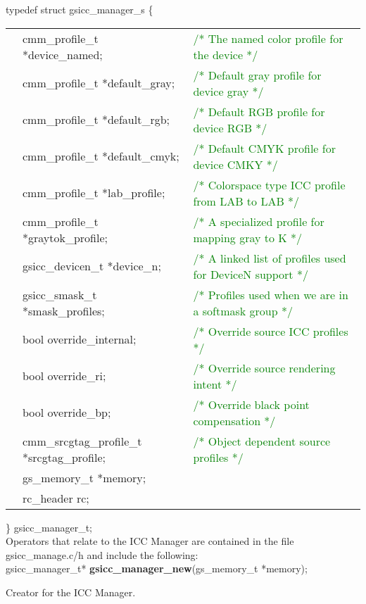\documentclass[12pt,notitlepage]{article}
\begin{document}
\noindent typedef struct gsicc\_manager\_s \{

\begin{tabular}{lll}
  & cmm\_profile\_t *device\_named;   & 	\textcolor{green}{/* The named color profile for the device */}  \\
  & cmm\_profile\_t *default\_gray;   & 	\textcolor{green}{/* Default gray profile for device gray */}   \\
  & cmm\_profile\_t *default\_rgb;    &	 \textcolor{green}{/* Default RGB profile for device RGB */}    \\
  & cmm\_profile\_t *default\_cmyk;   & 	\textcolor{green}{/* Default CMYK profile for device CMKY */} \\
  & cmm\_profile\_t *lab\_profile;    &  \textcolor{green}{/* Colorspace type ICC profile from LAB to LAB */}   \\
  & cmm\_profile\_t *graytok\_profile;&  \textcolor{green}{/* A specialized profile for mapping gray to K */}   \\
  & gsicc\_devicen\_t *device\_n;     &  \textcolor{green}{/* A linked list of profiles used for DeviceN support */} \\
  & gsicc\_smask\_t *smask\_profiles; &  \textcolor{green}{/* Profiles used when we are in a softmask group */ } \\
  & bool override\_internal; &  \textcolor{green}{/* Override source ICC profiles */ } \\
  & bool override\_ri;  &  \textcolor{green}{/* Override source rendering intent */ } \\
  & bool override\_bp;  &  \textcolor{green}{/* Override black point compensation */ } \\
  & cmm\_srcgtag\_profile\_t *srcgtag\_profile; &  \textcolor{green}{/* Object dependent source profiles */ } \\
  &       gs\_memory\_t *memory;    & \\
  &       rc\_header rc; &
\end{tabular}

\noindent  \} gsicc\_manager\_t;\\

\noindent Operators that relate to the ICC Manager are contained in the file gsicc\_manage.c/h and include the following:\\

\noindent gsicc\_manager\_t* {\bf gsicc\_manager\_new}(gs\_memory\_t *memory);\\
	
\begin{minipage}[h]{6.0in}
Creator for the ICC Manager.
\end{minipage}\\
\\
\end{document}
